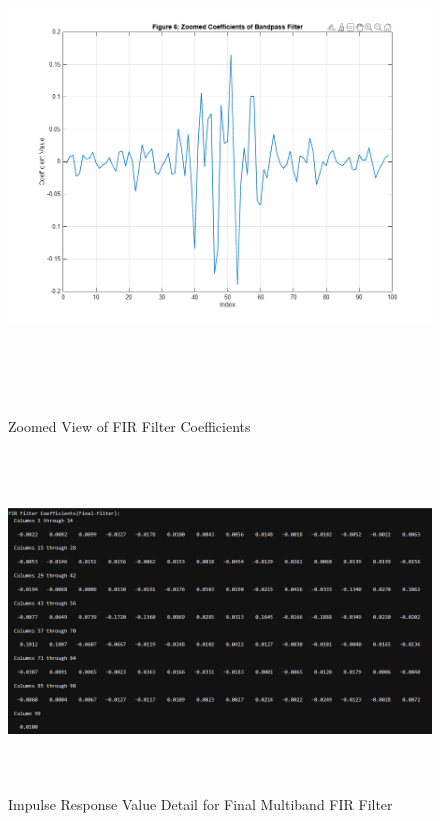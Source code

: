 \documentclass[12pt]{article}
\begin{document}
\begin{figure}[H]
    \centering
    \includegraphics[height=13cm]{6.png}
    \caption{Zoomed View of FIR Filter Coefficients}
    \label{fig:final_zoomed_coefficients}
\end{figure}

\begin{figure}[H]
    \centering
    \includegraphics[height=9cm]{7.png}
    \caption{Impulse Response Value Detail for Final Multiband FIR Filter}
    \label{fig:final_impulse_detail}
\end{figure}
\end{document}
